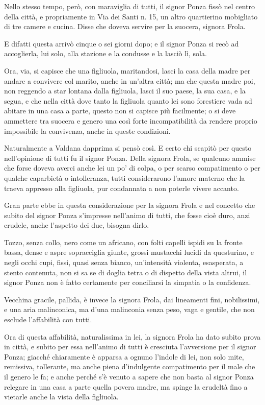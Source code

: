 \documentclass[12pt]{book}
\begin{document}
Nello stesso tempo, però, con maraviglia di tutti, il signor Ponza fissò nel centro della città, e propriamente in Via dei Santi n. 15, un altro quartierino mobigliato di tre camere e cucina. Disse che doveva servire per la suocera, signora Frola.

 E difatti questa arrivò cinque o sei giorni dopo; e il signor Ponza si recò ad accoglierla, lui solo, alla stazione e la condusse e la lasciò lì, sola.

Ora, via, si capisce che una figliuola, maritandosi, lasci la casa della madre per andare a convivere col marito, anche in un’altra città; ma che questa madre poi, non reggendo a star lontana dalla figliuola, lasci il suo paese, la sua casa, e la segua, e che nella città dove tanto la figliuola quanto lei sono forestiere vada ad abitare in una casa a parte, questo non si capisce più facilmente; o si deve ammettere tra suocera e genero una così forte incompatibilità da rendere proprio impossibile la convivenza, anche in queste condizioni.

Naturalmente a Valdana dapprima si pensò così. E certo chi scapitò per questo nell’opinione di tutti fu il signor Ponza. Della signora Frola, se qualcuno ammise che forse doveva averci anche lei un po’ di colpa, o per scarso compatimento o per qualche caparbietà o intolleranza, tutti considerarono l’amore materno che la traeva appresso alla figliuola, pur condannata a non poterle vivere accanto.


Gran parte ebbe in questa considerazione per la signora Frola e nel concetto che subito del signor Ponza s’impresse nell’animo di tutti, che fosse cioè duro, anzi crudele, anche l’aspetto dei due, bisogna dirlo.

 Tozzo, senza collo, nero come un africano, con folti capelli ispidi su la fronte bassa, dense e aspre sopracciglia giunte, grossi mustacchi lucidi da questurino, e negli occhi cupi, fissi, quasi senza bianco, un’intensità violenta, esasperata, a stento contenuta, non si sa se di doglia tetra o di dispetto della vista altrui, il signor Ponza non è fatto certamente per conciliarsi la simpatia o la confidenza.
 
  Vecchina gracile, pallida, è invece la signora Frola, dai lineamenti fini, nobilissimi, e una aria malinconica, ma d’una malinconia senza peso, vaga e gentile, che non esclude l’affabilità con tutti.

Ora di questa affabilità, naturalissima in lei, la signora Frola ha dato subito prova in città, e subito per essa nell’animo di tutti è cresciuta l’avversione per il signor Ponza; giacché chiaramente è apparsa a ognuno l’indole di lei, non solo mite, remissiva, tollerante, ma anche piena d’indulgente compatimento per il male che il genero le fa; e anche perché s’è venuto a sapere che non basta al signor Ponza relegare in una casa a parte quella povera madre, ma spinge la crudeltà fino a vietarle anche la vista della figliuola.
\end{document}
